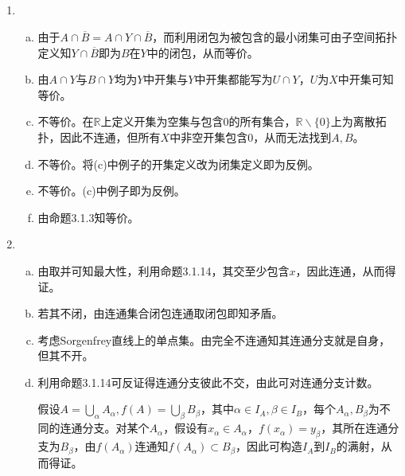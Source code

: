 \documentclass[a4paper,UTF8,fontset=windows]{ctexart}
\begin{document}
\subsection{}
\begin{enumerate}[(1)]
    \item
    \begin{enumerate}[(a)]
    \item
    由于$A\cap\overline{B}=A\cap Y\cap\overline{B}$，而利用闭包为被包含的最小闭集可由子空间拓扑定义知$Y\cap\overline{B}$即为$B$在$Y$中的闭包，从而等价。
    
    \item
    由$A\cap Y$与$B\cap Y$均为$Y$中开集与$Y$中开集都能写为$U\cap Y$，$U$为$X$中开集可知等价。
    
    \item
    不等价。在$\mathbb{R}$上定义开集为空集与包含0的所有集合，$\mathbb{R}\backslash\{0\}$上为离散拓扑，因此不连通，但所有$X$中非空开集包含0，从而无法找到$A,B$。
    
    \item
    不等价。将(c)中例子的开集定义改为闭集定义即为反例。
    
    \item
    不等价。(c)中例子即为反例。
    
    \item
    由命题3.1.3知等价。
    \end{enumerate}
    
    \item
    \begin{enumerate}[(a)]
    \item
    由取并可知最大性，利用命题3.1.14，其交至少包含$x$，因此连通，从而得证。
    
    \item
    若其不闭，由连通集合闭包连通取闭包即知矛盾。
    
    \item
    考虑Sorgenfrey直线上的单点集。由完全不连通知其连通分支就是自身，但其不开。
    
    \item
    利用命题3.1.14可反证得连通分支彼此不交，由此可对连通分支计数。
    
    假设$A=\bigcup_\alpha A_\alpha,f(A)=\bigcup_\beta B_\beta$，其中$\alpha\in I_A,\beta\in I_B$，每个$A_\alpha,B_\beta$为不同的连通分支。对某个$A_\alpha$，假设有$x_\alpha\in A_\alpha$，$f(x_\alpha)=y_\beta$，其所在连通分支为$B_\beta$，由$f(A_\alpha)$连通知$f(A_\alpha)\subset B_\beta$，因此可构造$I_A$到$I_B$的满射，从而得证。
    

\end{enumerate}
\end{enumerate}
\end{document}

